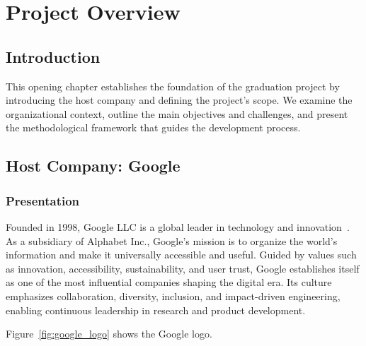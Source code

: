 \setcounter{mtc}{5} %
\chapter{Project Overview}
\minitoc  %

\graphicspath{{Chapitre1/figures/}}
\pagestyle{fancy}
\fancyhf{}
\fancyfoot[R]{\thepage}
\renewcommand{\headrulewidth}{0.5pt}
\renewcommand{\footrulewidth}{0pt}

\begin{spacing}{1.2}

\section*{Introduction}
This opening chapter establishes the foundation of the graduation project by introducing the
host company and defining the project’s scope. We examine the organizational context,
outline the main objectives and challenges, and present the methodological framework that
guides the development process.


\section{Host Company: Google} 

\subsection{Presentation} 
Founded in 1998, Google LLC is a global leader in technology and innovation~\cite{google2024company}. As a subsidiary of Alphabet Inc., Google's mission is to organize the world's information and make it universally accessible and useful. Guided by values such as innovation, accessibility, sustainability, and user trust, Google establishes itself as one of the most influential companies shaping the digital era. Its culture emphasizes collaboration, diversity, inclusion, and impact-driven engineering, enabling continuous leadership in research and product development.

Figure~\ref{fig:google_logo} shows the Google logo.


\end{spacing}
